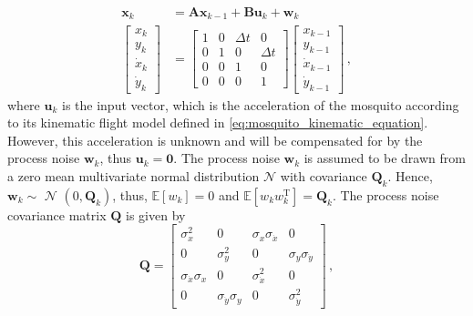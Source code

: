 \begin{equation}
    \begin{split}
        \mathbf{x}_k
        & = \mathbf{Ax}_{k-1} + \mathbf{Bu}_k + \mathbf{w}_k \\
        \begin{bmatrix}
            x_k       \\
            y_k       \\
            \dot{x}_k \\
            \dot{y}_k
        \end{bmatrix}
        & =
        \begin{bmatrix}
            1 & 0 & \Delta t & 0        \\
            0 & 1 & 0        & \Delta t \\
            0 & 0 & 1        & 0        \\
            0 & 0 & 0        & 1
        \end{bmatrix}
        \begin{bmatrix}
            x_{k-1}       \\
            y_{k-1}       \\
            \dot{x}_{k-1} \\
            \dot{y}_{k-1}
        \end{bmatrix}\,,
    \end{split}
\end{equation}
where $\mathbf{u}_k$ is the input vector, which is the acceleration of the mosquito according to its kinematic flight model defined in \autoref{eq:mosquito_kinematic_equation}. However, this acceleration is unknown and will be compensated for by the process noise $\mathbf{w}_k$, thus $\mathbf{u}_k = \mathbf{0}$. The process noise $\mathbf{w}_k$ is assumed to be drawn from a zero mean multivariate normal distribution $\mathcal{N}$ with covariance $\mathbf{Q}_k$. Hence, $\mathbf{w}_k \sim$ $\mathcal{N}$ $\left(0, \mathbf{Q}_k\right)$, thus, $\mathbb{E}[w_k] = 0$ and $\mathbb{E}[w_kw_k^\mathrm{T}] = \mathbf{Q}_k$. The process noise covariance matrix $\mathbf{Q}$ is given by
\begin{equation}
    \label{eq:kalman_filter_process_noise_covariance_matrix}
    \mathbf{Q} = \begin{bmatrix}
        \sigma_{x}^2               & 0                          & \sigma_{x}\sigma_{\dot{x}} & 0                          \\
        0                          & \sigma_{y}^2               & 0                          & \sigma_{y}\sigma_{\dot{y}} \\
        \sigma_{\dot{x}}\sigma_{x} & 0                          & \sigma_{\dot{x}}^2         & 0                          \\
        0                          & \sigma_{\dot{y}}\sigma_{y} & 0                          & \sigma_{\dot{y}}^2
    \end{bmatrix}\,,
\end{equation}
